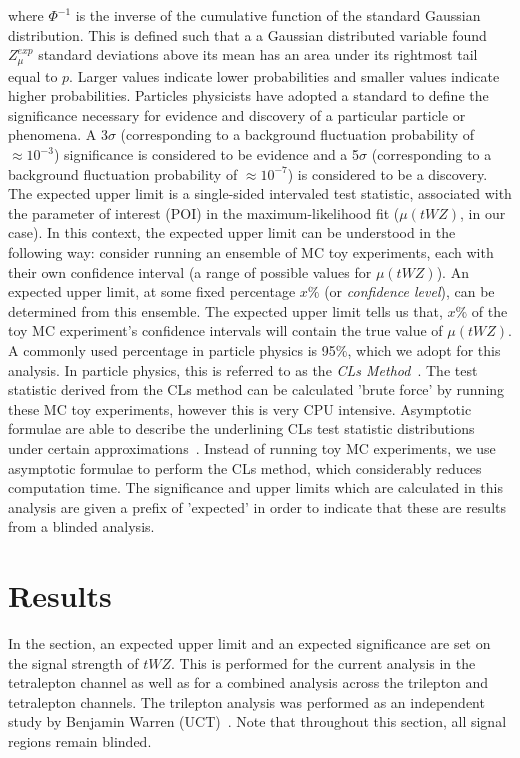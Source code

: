 where $\Phi^{-1}$ is the inverse of the cumulative function of the standard Gaussian distribution. This is defined such that a a Gaussian distributed variable found $Z_{\mu}^{exp}$ standard deviations above its mean has an area under its rightmost tail equal to $p$. Larger values indicate lower probabilities and smaller values indicate higher probabilities. Particles physicists have adopted a standard to define the significance necessary for evidence and discovery of a particular particle or phenomena. A 3$\sigma$ (corresponding to a background fluctuation probability of $\approx 10^{-3}$) significance is considered to be evidence and a 5$\sigma$ (corresponding to a background fluctuation probability of $\approx 10^{-7}$) is considered to be a discovery. The expected upper limit is a single-sided intervaled test statistic, associated with the parameter of interest (POI) in the maximum-likelihood fit ($\mu (tWZ)$, in our case). In this context, the expected upper limit can be understood in the following way: consider running an ensemble of MC toy experiments, each with their own confidence interval (a range of possible values for $\mu (tWZ)$). An expected upper limit, at some fixed percentage $x\%$ (or \textit{confidence level}), can be determined from this ensemble. The expected upper limit tells us that, $x\%$ of the toy MC experiment's confidence intervals will contain the true value of $\mu (tWZ)$. A commonly used percentage in particle physics is 95$\%$, which we adopt for this analysis. In particle physics, this is referred to as the \textit{CLs Method}~\cite{Cowan_2011}. The test statistic derived from the CLs method can be calculated 'brute force' by running these MC toy experiments, however this is very CPU intensive. Asymptotic formulae are able to describe the underlining CLs test statistic distributions under certain approximations~\cite{asymptotic-formulae-slides}. Instead of running toy MC experiments, we use asymptotic formulae to perform the CLs method, which considerably reduces computation time. The significance and upper limits which are calculated in this analysis are given a prefix of 'expected' in order to indicate that these are results from a blinded analysis. 

\section{Results}

In the section, an expected upper limit and an expected significance are set on the signal strength of $tWZ$. This is performed for the current analysis in the tetralepton channel as well as for a combined analysis across the trilepton and tetralepton channels. The trilepton analysis was performed as an independent study by Benjamin Warren (UCT)~\cite{ben-thesis}. Note that throughout this section, all signal regions remain blinded.

